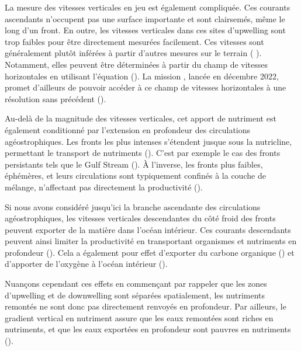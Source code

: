 La mesure des vitesses verticales en jeu est également compliquée.
Ces courants ascendants n'occupent pas une surface importante et sont clairsemés, même le long d'un front.
En outre, les vitesses verticales dans ces sites d'upwelling sont  trop faibles pour être directement mesurées facilement.
Ces vitesses sont généralement plutôt inférées à partir d'autres mesures sur le terrain ( \cite{dasaro_2018,tarry_2021,comby_2022,cutolo_2022}).
Notamment, elles peuvent être déterminées à partir du champ de vitesses horizontales en utilisant l'équation  (\cite{hoskins_1978,pietri_2021}).
La mission , lancée en décembre 2022, promet d'ailleurs de pouvoir accéder à ce champ de vitesses horizontales à une résolution sans précédent (\cite{dovidio_2019,morrow_2019,barcelo-llull_2021}).

Au-delà de la magnitude des vitesses verticales, cet apport de nutriment est également conditionné par l'extension en profondeur des circulations agéostrophiques.
Les fronts les plus intenses s'étendent jusque sous la nutricline, permettant le transport de nutriments (\cite{levy_2001,thomas_2013,pasquerondefommervault_2015,capet_2016}).
C'est par exemple le cas des fronts persistants tels que le Gulf Stream (\cite{levy_2012a}).
À l'inverse, les fronts plus faibles, éphémères, et leurs circulations sont typiquement confinés à la couche de mélange, n'affectant pas directement la productivité (\cite{ramachandran_2014,levy_2018}).

Si nous avons considéré jusqu'ici la branche ascendante des circulations agéostrophiques, les vitesses verticales descendantes du côté froid des fronts peuvent exporter de la matière dans l'océan intérieur.
Ces courants descendants peuvent ainsi limiter la productivité en transportant organismes et nutriments en profondeur (\cite{mcgillicuddy_2003,lathuiliere_2010,gruber_2011,levy_2012a,resplandy_2019}).
Cela a également pour effet d'exporter du carbone organique (\cite{levy_2001,omand_2015}) et d'apporter de l'oxygène à l'océan intérieur (\cite{resplandy_2012}).

Nuançons cependant ces effets en commençant par rappeler que les zones d'upwelling et de downwelling sont séparées spatialement, les nutriments remontés ne sont donc pas directement renvoyés en profondeur.
Par ailleurs, le gradient vertical en nutriment  assure que les eaux remontées sont riches en nutriments, et que les eaux exportées en profondeur sont pauvres en nutriments (\cite{mahadevan_2016}).

